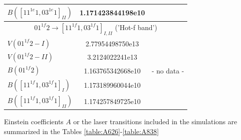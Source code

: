 \documentclass{report}
\begin{document}
\begin{table}
\begin{tabular}{|l|cccccc|}
$B([11^{1e}1,03^{1e}1]_{II})$ & 1.171423844198e10 &  &  &  &  &\\
\hline
\multicolumn{7}{|c|}{$01^{1f}2\rightarrow[11^{1f}1,03^{1f}1]_{I,II}$ ('Hot-f band')}\\
\hline
$V(01^{1f}2-I)$               & 2.77954498750e13  &  &  &  &  &\\
$V(01^{1f}2-II)$              & 3.2124022241e13   &  &  &  &  &\\
$B(01^{1f}2)$                 & 1.163765342668e10 & \multicolumn{5}{c|}{- no data -}\\
$B([11^{1f}1,03^{1f}1]_I)$    & 1.173189960044e10 &  &  &  &  &\\
$B([11^{1f}1,03^{1f}1]_{II})$ & 1.174257849725e10 &  &  &  &  &\\
\hline
\end{tabular}
\end{table}


Einstein coefficients $A$ or the laser transitions included in the simulations are summarized in the Tables \ref{table:A626}-\ref{table:A838}
\end{document}
